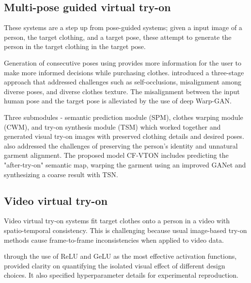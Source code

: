 	\subsection{Multi-pose guided virtual try-on}
		These systems are a step up from pose-guided systems; given a input image of a person, the target clothing, and a target pose, these attempt to generate the person in the target clothing in the target pose.

        Generation of consecutive poses using \cite{DBLP:conf/icip/HsiehCCSC19} provides more information for the user to make more informed decisions while purchasing clothes. \cite{DBLP:conf/iccv/DongLSWLZH019} introduced a three-stage approach that addressed challenges such as self-occlusions, misalignment among diverse poses, and diverse clothes texture. The misalignment between the input human pose and the target pose is alleviated by the use of deep Warp-GAN.


        Three submodules - semantic prediction module (SPM), clothes warping module (CWM), and try-on synthesis module (TSM) which worked together \cite{DBLP:journals/tmm/HuLZR22}  and generated visual try-on images with preserved clothing details and desired poses. \cite{du2023cf} also addressed the challenges of preserving the person's identity and unnatural garment alignment. The proposed model CF-VTON includes predicting the "after-try-on" semantic map, warping the garment using an improved GANet and synthesizing a coarse result with TSN.
        

	\subsection{Video virtual try-on}
		Video virtual try-on systems fit target clothes onto a person in a video with spatio-temporal consistency. This is challenging because usual image-based try-on methods cause frame-to-frame inconsistencies when applied to video data.

        \cite{DBLP:conf/wacv/KuppaJLLM21} through the use of ReLU and GeLU as the most effective activation functions, provided clarity on quantifying the isolated visual effect of different design choices. It also specified hyperparameter details for experimental reproduction. 

